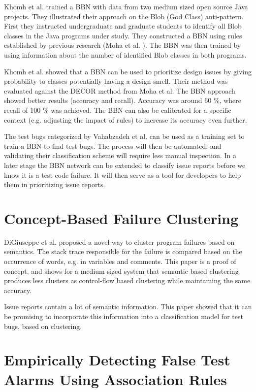 \documentclass{uvamscse}
\newcommand{\Atestbugs}{Vahabzadeh et al.}
\begin{document}
Khomh et al. trained a BBN with data from two medium sized open source Java projects. They illustrated their approach on the Blob (God Class) anti-pattern. First they instructed undergraduate and graduate students to identify all Blob classes in the Java programs under study. They constructed a BBN using rules established by previous research (Moha et al. \cite{moha2010domain}). The BBN was then trained by using information about the number of identified Blob classes in both programs. 

Khomh et al. showed that a BBN can be used to prioritize design issues by giving probability to classes potentially having a design smell. Their method was evaluated against the DECOR method from Moha et al.\cite{moha2010domain} The BBN approach showed better results (accuracy and recall). Accuracy was around 60 \%, where recall of 100 \% was achieved. The BBN can also be calibrated for a specific context (e.g. adjusting the impact of rules) to increase its accuracy even further. 

The test bugs categorized by \Atestbugs{} \cite{vahabzadeh2015empirical} can be used as a training set to train a BBN to find test bugs. The process will then be automated, and validating their classification scheme will require less manual inspection. In a later stage the BBN network can be extended to classify issue reports before we know it is a test code failure. It will then serve as a tool for developers to help them in prioritizing issue reports. 

\section{Concept-Based Failure Clustering}
DiGiuseppe et al. \cite{digiuseppe2012concept} proposed a novel way to cluster program failures based on semantics. The stack trace responsible for the failure is compared based on the occurrence of words, e.g. in variables and comments. This paper is a proof of concept, and shows for a medium sized system that semantic based clustering produces less clusters as control-flow based clustering while maintaining the same accuracy. 

Issue reports contain a lot of semantic information. This paper showed that it can be promising to incorporate this information into a classification model for test bugs, based on clustering. 


\section{Empirically Detecting False Test Alarms Using Association Rules}
\end{document}
